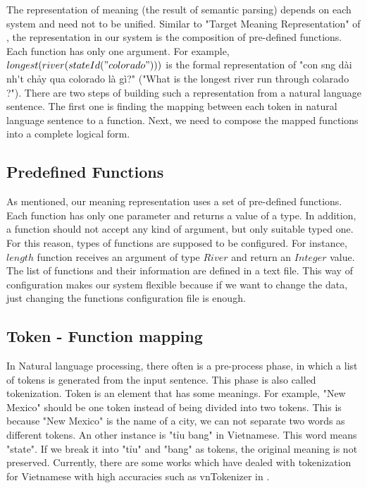 \label{sec:c-u}

The representation of meaning (the result of semantic parsing) depends on each system and need not to be unified. Similar to "Target Meaning Representation" of \cite{Clarke:2010:DSP:1870568.1870571}, the representation in our system is the composition of pre-defined functions. Each function has only one argument. For example, $longest(river(stateId\\("colorado")))$ is the formal representation of
"{\selectfont con s\ocircumflex ng d\`ai nh\'\acircumflex t ch\h{a}y qua colorado l\`a g\`i?}" ("What is the longest river run through colarado ?"). There are two steps of building such a representation from a natural language sentence. The first one is finding the mapping between each token in natural language sentence to a function. Next, we need to compose the mapped functions into a complete logical form.

\subsection{Predefined Functions}
As mentioned, our meaning representation uses a set of pre-defined functions. Each function has only one parameter and returns a value of a type. In addition, a function should not accept any kind of argument, but only suitable typed one. For this reason, types of functions are supposed to be configured. For instance, $length$ function receives an argument of type $River$ and return an $Integer$ value. The list of functions and their information are defined in a text file. This way of configuration makes our system flexible because if we want to change the data, just changing the functions configuration file is enough.

\subsection{Token - Function mapping}
In Natural language processing, there often is a pre-process phase, in which a list of tokens is generated from the input sentence. This phase is also called tokenization. Token is an element that has some meanings. For example, "New Mexico" should be one token instead of being divided into two tokens. This is because "New Mexico" is the name of a city, we can not separate two words as different tokens. An other instance is "{\selectfont ti\h\ecircumflex u bang}" in Vietnamese. This word means "state". If we break it into "{\selectfont ti\h\ecircumflex u}" and "bang" as tokens, the original meaning is not preserved. Currently, there are some works which have dealed with tokenization for Vietnamese with high accuracies such as vnTokenizer in \cite{Phuong:2008:HAW:1431170.1431195}.

